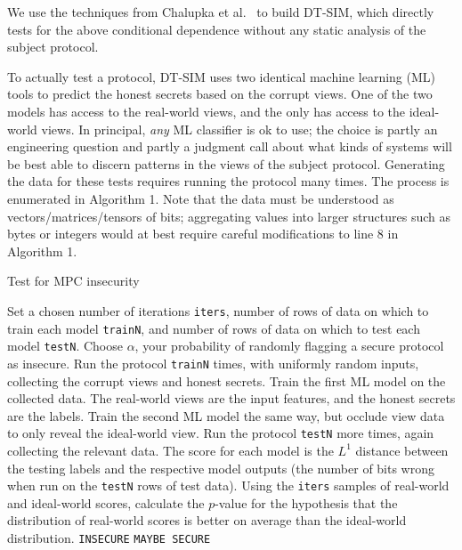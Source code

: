 \documentclass[compsoc, conference, a4paper, 10pt, times]{IEEEtran}
\newcommand{\toolname}{\textsc{DT-SIM}\xspace}
\begin{document}
We use the techniques from Chalupka et al.~\cite{chalupka2018fast} to build \toolname,
which directly tests for the above conditional dependence without any static analysis of the subject protocol.

To actually test a protocol, \toolname uses two identical machine learning (ML) tools to predict the honest secrets based on the corrupt views.
One of the two models has access to the real-world views, and the only has access to the ideal-world views.
In principal, \textit{any} ML classifier is ok to use; the choice is partly an engineering question
and partly a judgment call about what kinds of systems will be best able to discern patterns in the views of the subject protocol.
Generating the data for these tests requires running the protocol many times.
The process is enumerated in Algorithm 1.
Note that the data must be understood as vectors/matrices/tensors of bits;
aggregating values into larger structures such as bytes or integers would at best require careful modifications to line 8 in Algorithm 1.

\begin{algorithm}  %
  \caption{Test for MPC insecurity}
  \begin{algorithmic}[1]
    \STATE Set a chosen number of iterations \texttt{iters},
           number of rows of data on which to train each model \texttt{trainN},
           and number of rows of data on which to test each model \texttt{testN}.
  \STATE Choose $\alpha$, your probability of randomly flagging a secure protocol as insecure.
      \STATE Run the protocol \texttt{trainN} times,
             with uniformly random inputs,
             collecting the corrupt views and honest secrets.
      \STATE Train the first ML model on the collected data.
             The real-world views are the input features, and the honest secrets are the labels.
      \STATE Train the second ML model the same way, but occlude view data to only reveal the ideal-world view.
      \STATE Run the protocol \texttt{testN} more times, again collecting the relevant data.
      \STATE The score for each model is the $L^1$ distance between the testing labels and the respective model outputs
             (\ie the number of bits wrong when run on the \texttt{testN} rows of test data).
    \ENDFOR
    \STATE Using the \texttt{iters} samples of real-world and ideal-world scores,
           calculate the $p$-value for the hypothesis that
           the distribution of real-world scores is better on average than the ideal-world distribution.
     \RETURN \texttt{INSECURE} \ELSE \RETURN \texttt{MAYBE SECURE} \ENDIF
  \end{algorithmic}
\end{algorithm}
\end{document}
